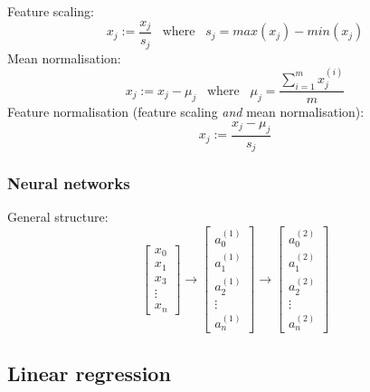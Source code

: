 \documentclass[12pt]{article}
\begin{document}
Feature scaling:
\begin{equation}
x_j:=\frac{x_j}{s_j}\;\;\; \textrm{where}\;\;\; s_j=max(x_j)-min(x_j)
\end{equation}
Mean normalisation:
\begin{equation}
x_j:=x_j-\mu_j\;\;\; \textrm{where}\;\;\; \mu_j=\frac{\sum_{i=1}^{m}x_j^{(i)}}{m}
\end{equation}
Feature normalisation (feature scaling \textit{and} mean normalisation):
\begin{equation}
x_j:=\frac{x_j-\mu_j}{s_j}
\end{equation}
\subsubsection{Neural networks}
General structure:
\begin{equation}
\begin{bmatrix}
x_0\\x_1\\x_3\\ \vdots \\ x_n
\end{bmatrix}
\rightarrow \begin{bmatrix}
a_0^{(1)}\\a_1^{(1)}\\a_2^{(1)}\\ \vdots \\ a_n^{(1)}
\end{bmatrix}
\rightarrow \begin{bmatrix}
a_0^{(2)}\\a_1^{(2)}\\a_2^{(2)}\\ \vdots \\ a_n^{(2)}
\end{bmatrix}
\end{equation}
\newpage

\subsection{Linear regression}
\end{document}

